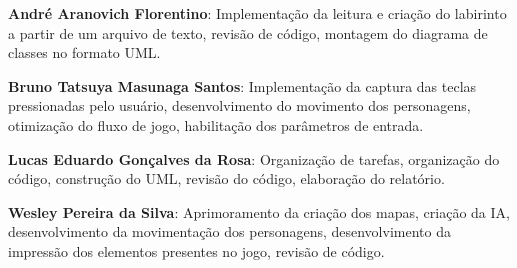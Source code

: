 \documentclass[]{article}
\begin{document}
\textbf{André Aranovich Florentino}: Implementação da leitura e criação do labirinto a partir de um arquivo de texto, revisão de código, montagem do diagrama de classes no formato UML.

\textbf{Bruno Tatsuya Masunaga Santos}: Implementação da captura das teclas pressionadas pelo usuário, desenvolvimento do movimento dos personagens, otimização do fluxo de jogo, habilitação dos parâmetros de entrada.

\textbf{Lucas Eduardo Gonçalves da Rosa}: Organização de tarefas, organização do código, construção do UML, revisão do código, elaboração do relatório.

\textbf{Wesley Pereira da Silva}: Aprimoramento da criação dos mapas, criação da IA, desenvolvimento da movimentação dos personagens, desenvolvimento da impressão dos elementos presentes no jogo, revisão de código.
\end{document}
